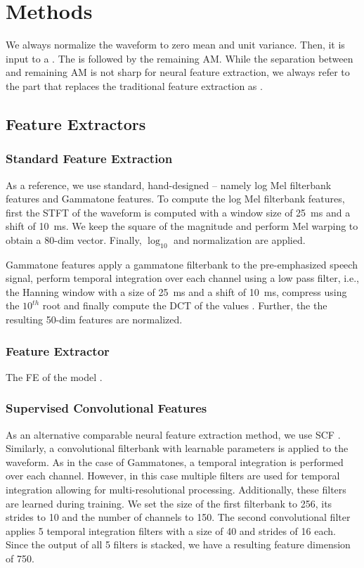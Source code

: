 \documentclass{INTERSPEECH2023}
\begin{document}
\section{Methods}
We always normalize the waveform to zero mean and unit variance.
Then, it is input to a \fe.
The \fe is followed by the remaining \gls{AM}.
While the separation between \fe and remaining \gls{AM} is not sharp for neural feature extraction, we always refer to the part that replaces the traditional feature extraction as \fe.

\subsection{Feature Extractors}
\subsubsection{Standard Feature Extraction}
As a reference, we use standard, hand-designed \fes -- namely log Mel filterbank features and Gammatone features.
To compute the log Mel filterbank features, first the \gls{STFT} of the waveform is computed with a window size of \SI{25}{\milli\second} and a shift of \SI{10}{\milli\second}.
We keep the square of the magnitude and perform Mel warping to obtain a 80-dim vector.
Finally, $\log_{10}$ and normalization are applied.

Gammatone features apply a gammatone filterbank to the pre-emphasized speech signal, perform temporal integration over each channel using a low pass filter, i.e., the Hanning window with a size of \SI{25}{\milli\second} and a shift of \SI{10}{\milli\second}, compress using the $10^{th}$ root and finally compute the \gls{DCT} of the values \cite{schlueter:icassp07}.
Further, the the resulting 50-dim features are normalized.

\subsubsection{\wvtwo Feature Extractor}
The \gls{FE} of the \wvtwo model \cite{facebook2020wav2vec2}.

\subsubsection{Supervised Convolutional Features}
As an alternative comparable neural feature extraction method, we use \gls{SCF} \cite{tuske2018:waveform}.
Similarly, a convolutional filterbank with learnable parameters is applied to the waveform.
As in the case of Gammatones, a temporal integration is performed over each channel.
However, in this case multiple filters are used for temporal integration allowing for multi-resolutional processing.
Additionally, these filters are learned during training.
We set the size of the first filterbank to 256, its strides to 10 and the number of channels to 150.
The second convolutional filter applies 5 temporal integration filters with a size of 40 and strides of 16 each.
Since the output of all 5 filters is stacked, we have a resulting feature dimension of 750.
\end{document}
